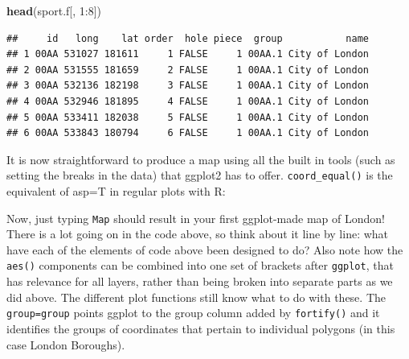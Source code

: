 \documentclass[]{article}
\newenvironment{Shaded}{}{}
\newcommand{\KeywordTok}[1]{\textcolor[rgb]{0.00,0.44,0.13}{\textbf{{#1}}}}
\newcommand{\DataTypeTok}[1]{\textcolor[rgb]{0.56,0.13,0.00}{{#1}}}
\newcommand{\DecValTok}[1]{\textcolor[rgb]{0.25,0.63,0.44}{{#1}}}
\newcommand{\StringTok}[1]{\textcolor[rgb]{0.25,0.44,0.63}{{#1}}}
\newcommand{\NormalTok}[1]{{#1}}
\begin{document}
\begin{Shaded}
\begin{Highlighting}[]
\KeywordTok{head}\NormalTok{(sport.f[, }\DecValTok{1}\NormalTok{:}\DecValTok{8}\NormalTok{])}
\end{Highlighting}
\end{Shaded}
\begin{verbatim}
##     id   long    lat order  hole piece  group           name
## 1 00AA 531027 181611     1 FALSE     1 00AA.1 City of London
## 2 00AA 531555 181659     2 FALSE     1 00AA.1 City of London
## 3 00AA 532136 182198     3 FALSE     1 00AA.1 City of London
## 4 00AA 532946 181895     4 FALSE     1 00AA.1 City of London
## 5 00AA 533411 182038     5 FALSE     1 00AA.1 City of London
## 6 00AA 533843 180794     6 FALSE     1 00AA.1 City of London
\end{verbatim}
It is now straightforward to produce a map using all the built in tools
(such as setting the breaks in the data) that ggplot2 has to offer.
\texttt{coord\_equal()} is the equivalent of asp=T in regular plots with
R:

\begin{Shaded}
\end{Shaded}
Now, just typing \texttt{Map} should result in your first ggplot-made
map of London! There is a lot going on in the code above, so think about
it line by line: what have each of the elements of code above been
designed to do? Also note how the \texttt{aes()} components can be
combined into one set of brackets after \texttt{ggplot}, that has
relevance for all layers, rather than being broken into separate parts
as we did above. The different plot functions still know what to do with
these. The \texttt{group=group} points ggplot to the group column added
by \texttt{fortify()} and it identifies the groups of coordinates that
pertain to individual polygons (in this case London Boroughs).
\end{document}
